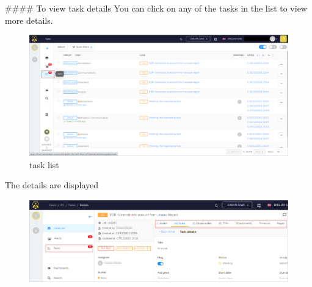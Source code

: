 


\begin{markdown}
#### To view task details
You can click on any of the tasks in the list to view more details.
\end{markdown}

\begin{figure}[H]
    \centering
    \includegraphics[width=\textwidth]{images/docs/analyst/task/about/task_menu.png}
    \caption{task list}
    \label{fig:modules}
\end{figure}

\begin{markdown}

The details are displayed
\end{markdown}



\begin{figure}[H]
    \centering
    \includegraphics[width=\textwidth]{images/docs/analyst/task/about/tasks-details-tabs-menu.png}
    \label{fig:modules}
\end{figure}

